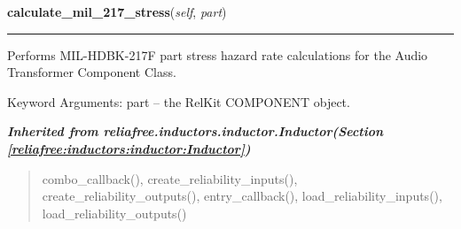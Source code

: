 \hspace{.8\funcindent}\begin{boxedminipage}{\funcwidth}

    \raggedright \textbf{calculate\_mil\_217\_stress}(\textit{self}, \textit{part})

    \vspace{-1.5ex}

    \rule{\textwidth}{0.5\fboxrule}
\setlength{\parskip}{2ex}
    Performs MIL-HDBK-217F part stress hazard rate calculations for the 
    Audio Transformer Component Class.

    Keyword Arguments: part -- the RelKit COMPONENT object.

\setlength{\parskip}{1ex}
    \end{boxedminipage}


\large{\textbf{\textit{Inherited from reliafree.inductors.inductor.Inductor\textit{(Section \ref{reliafree:inductors:inductor:Inductor})}}}}

\begin{quote}
combo\_callback(), create\_reliability\_inputs(), create\_reliability\_outputs(), entry\_callback(), load\_reliability\_inputs(), load\_reliability\_outputs()
\end{quote}

